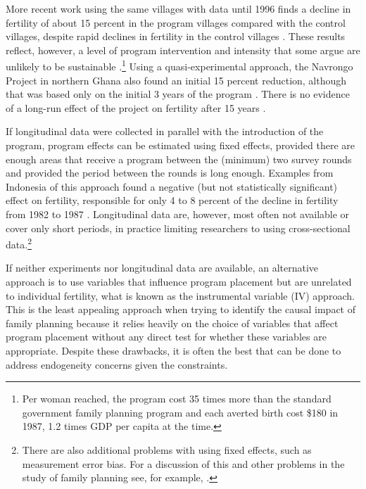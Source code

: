 More recent work using the same villages with data until 1996 finds a decline in fertility of about 15 percent in the program villages compared with the control villages, despite rapid declines in fertility in the control villages \citep{Sinha2005,Joshi2007}. These results reflect, however, a level of program intervention and intensity that some argue are unlikely to be sustainable \citep{pritchett94a}.\footnote{Per woman reached, the program cost 35 times more than the standard government family planning program and each averted birth cost \$180 in 1987, 1.2 times GDP per capita at the time.} Using a quasi-experimental approach, the Navrongo Project in northern Ghana also found an initial 15 percent reduction, although that was based only on the initial 3 years of the program \citep{Debpuur2002}. There is no evidence of a long-run effect of the project on fertility after 15 years \citep{Phillips2012}.

If longitudinal data were collected in parallel with the introduction of the program, program effects can be estimated using fixed effects, provided there are enough areas that receive a program between the (minimum) two survey rounds and provided the period between the rounds is long enough. Examples from Indonesia of this approach found a negative (but not statistically significant) effect on fertility, responsible for only 4 to 8 percent of the decline in fertility from 1982 to 1987 \citep{pitt93,Gertler1994}. Longitudinal data are, however, most often not available or cover only short periods, in practice limiting researchers to using cross-sectional data.\footnote{There are also additional problems with using fixed effects, such as measurement error bias. For a discussion of this and other problems in the study of family planning see, for example, \cite{angeles98}.}

If neither experiments nor longitudinal data are available, an alternative approach is to use variables that influence program placement but are unrelated to individual fertility, what is known as the instrumental variable (IV) approach. This is the least appealing approach when trying to identify the causal impact of family planning because it relies heavily on the choice of variables that affect program placement without any direct test for whether these variables are appropriate. Despite these drawbacks, it is often the best that can be done to address endogeneity concerns given the constraints.

